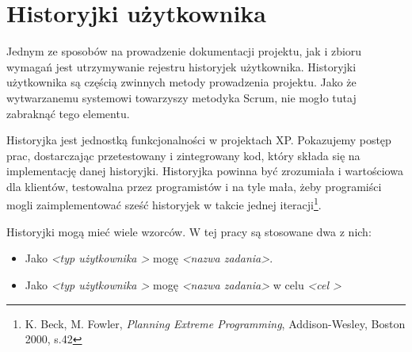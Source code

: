 



\thispagestyle{empty}
\kartapracy
\myemptypage

\linespread{1.49}
\thispagestyle{empty}
\stronatytulowa

\normalsize
\oswiadczenie
\newpage


\myemptypage

\tableofcontents
\newpage
\listoffigures
\newpage
\listoftables
\newpage

\setcounter{licznikStron}{\value{page}}
\setcounter{licznikStron}{1}
\setcounter{page}{\value{licznikStron}}


\section{Historyjki użytkownika}
Jednym ze sposobów na prowadzenie dokumentacji projektu, jak i zbioru wymagań jest utrzymywanie rejestru historyjek użytkownika. Historyjki użytkownika są częścią zwinnych metody prowadzenia projektu. Jako że wytwarzanemu systemowi towarzyszy metodyka Scrum, nie mogło tutaj zabraknąć tego elementu.

\begin{italicquote}
	Historyjka jest jednostką funkcjonalności w projektach XP. Pokazujemy postęp prac, dostarczając przetestowany i zintegrowany kod, który składa się na implementację danej historyjki. Historyjka powinna być zrozumiała i wartościowa dla klientów, testowalna przez programistów i na tyle mała, żeby programiści mogli zaimplementować sześć historyjek w takcie jednej iteracji\footnote{K. Beck, M. Fowler, \textit{Planning Extreme Programming}, Addison-Wesley, Boston 2000, s.42}.
\end{italicquote}

Historyjki mogą mieć wiele wzorców. W tej pracy są stosowane dwa z nich:
\begin{itemize}
	\item Jako \textit{\textless typ użytkownika \textgreater} mogę \textit{\textless nazwa zadania\textgreater}.
	\item Jako \textit{\textless typ użytkownika \textgreater} mogę \textit{\textless nazwa zadania\textgreater} w celu \textit{\textless cel \textgreater}\cite{SCRUM}
\end{itemize} 

